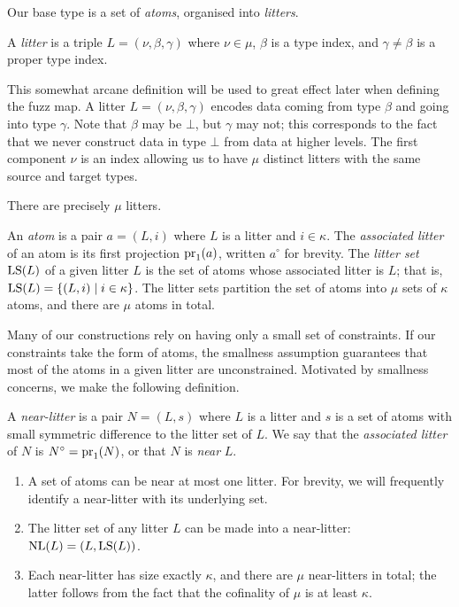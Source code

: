 Our base type is a set of \emph{atoms}, organised into \emph{litters}.
\begin{definition}
    A \emph{litter} is a triple \( L = (\nu, \beta, \gamma) \) where \( \nu \in \mu \), \( \beta \) is a type index, and \( \gamma \neq \beta \) is a proper type index.
\end{definition}
This somewhat arcane definition will be used to great effect later when defining the fuzz map.
A litter \( L = (\nu, \beta, \gamma) \) encodes data coming from type \( \beta \) and going into type \( \gamma \).
Note that \( \beta \) may be \( \bot \), but \( \gamma \) may not; this corresponds to the fact that we never construct data in type \( \bot \) from data at higher levels.
The first component \( \nu \) is an index allowing us to have \( \mu \) distinct litters with the same source and target types.
\begin{remark}
    There are precisely \( \mu \) litters.
\end{remark}
\begin{definition}
    An \emph{atom} is a pair \( a = (L, i) \) where \( L \) is a litter and \( i \in \kappa \).
    The \emph{associated litter} of an atom is its first projection \( \operatorname{pr}_1(a) \), written \( a^\circ \) for brevity.
    The \emph{litter set} \( \operatorname{LS}(L) \) of a given litter \( L \) is the set of atoms whose associated litter is \( L \); that is, \( \operatorname{LS}(L) = \{ (L, i) \mid i \in \kappa \} \).
    The litter sets partition the set of atoms into \( \mu \) sets of \( \kappa \) atoms, and there are \( \mu \) atoms in total.
\end{definition}
\begin{remark}
    Many of our constructions rely on having only a small set of constraints.
    If our constraints take the form of atoms, the smallness assumption guarantees that most of the atoms in a given litter are unconstrained.
    Motivated by smallness concerns, we make the following definition.
\end{remark}
\begin{definition}
    A \emph{near-litter} is a pair \( N = (L, s) \) where \( L \) is a litter and \( s \) is a set of atoms with small symmetric difference to the litter set of \( L \).
    We say that the \emph{associated litter} of \( N \) is \( N^\circ = \operatorname{pr}_1(N) \), or that \( N \) is \emph{near} \( L \).
\end{definition}
\begin{remarks}
    \label{rk:mk_near_litter}
    \begin{enumerate}
        \item A set of atoms can be near at most one litter.
        For brevity, we will frequently identify a near-litter with its underlying set.
        \item The litter set of any litter \( L \) can be made into a near-litter: \( \operatorname{NL}(L) = (L, \operatorname{LS}(L)) \).
        \item Each near-litter has size exactly \( \kappa \), and there are \( \mu \) near-litters in total; the latter follows from the fact that the cofinality of \( \mu \) is at least \( \kappa \).
    \end{enumerate}
\end{remarks}

